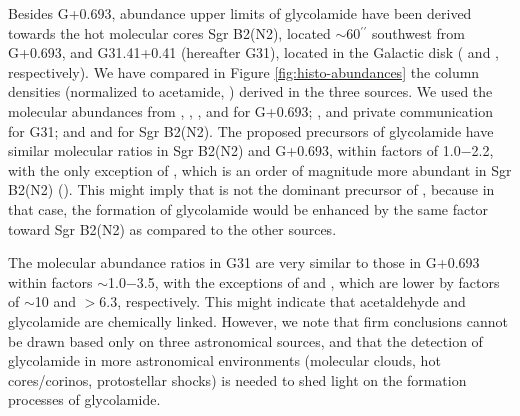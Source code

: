 \documentclass[twocolumn]{aastex63}
\begin{document}
Besides G+0.693, abundance upper limits of glycolamide have been derived towards the hot molecular cores Sgr B2(N2), located $\sim$60$^{\prime\prime}$ southwest from G+0.693, and G31.41+0.41 (hereafter G31), located in the Galactic disk (\citealt{sanz-novo2020} and \citealt{colzi2021}, respectively).
We have compared in Figure \ref{fig:histo-abundances} the column densities (normalized to acetamide, ) derived in the three sources. 
We used the molecular abundances from \citet{zeng2018}, \citet{Sanz-Novo2022}, \citet{rivilla2022a}, and \citet{zeng2023} for G+0.693; \citet{mininni2020}, \citet{colzi2021} and private communication for G31; and \citet{belloche2017} and \citet{sanz-novo2020} for Sgr B2(N2).
The proposed precursors of glycolamide have similar molecular ratios in  Sgr B2(N2) and G+0.693, within factors of 1.0$-$2.2, with the only exception of , which is an order of magnitude more abundant in Sgr B2(N2) (\citealt{belloche2017}). This might imply that  is not the dominant precursor of , because in that case, the formation of glycolamide would be enhanced by the same factor toward Sgr B2(N2) as compared to the other sources.

The molecular abundance ratios in G31 are very similar to those in G+0.693 within factors $\sim$1.0$-$3.5, with the exceptions of  and , which are lower by factors of $\sim$10 and $>$6.3, respectively. 
This might indicate that acetaldehyde and glycolamide are chemically linked. 
However, we note that firm conclusions cannot be drawn based only on three astronomical sources, and that the detection of glycolamide in more astronomical environments (molecular clouds, hot cores/corinos, protostellar shocks) is needed to shed light on the formation processes of glycolamide. 
\end{document}
